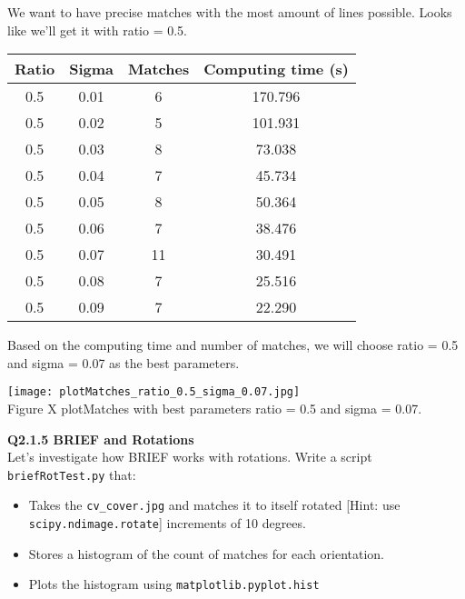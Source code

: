 \documentclass[12pt,letterpaper, onecolumn]{exam}
\begin{document}
\begin{questions}
\begin{solution}
\begin{center}
        \end{center}
        We want to have precise matches with the most amount of lines possible. Looks like we'll get it with ratio = 0.5.
        \begin{center}
            \begin{tabular}{|c|c|c|c|}
                \hline
                \textbf{Ratio} & \textbf{Sigma} & \textbf{Matches} & \textbf{Computing time (s)} \\
                \hline
                0.5 & 0.01 & 6 & 170.796 \\
                \hline
                0.5 & 0.02 & 5 & 101.931 \\
                \hline
                0.5 & 0.03 & 8 & 73.038 \\
                \hline
                0.5 & 0.04 & 7 & 45.734 \\
                \hline
                0.5 & 0.05 & 8 & 50.364 \\
                \hline
                0.5 & 0.06 & 7 & 38.476 \\
                \hline
                0.5 & 0.07 & 11 & 30.491 \\
                \hline
                0.5 & 0.08 & 7 & 25.516 \\
                \hline
                0.5 & 0.09 & 7 & 22.290 \\
                \hline
            \end{tabular}
        \end{center}
        Based on the computing time and number of matches, we will choose ratio = 0.5 and sigma = 0.07 as the best parameters.
        \begin{center}
            \texttt{[image: plotMatches\_ratio\_0.5\_sigma\_0.07.jpg]}\\
            Figure X plotMatches with best parameters ratio = 0.5 and sigma = 0.07.
        \end{center}

    \end{solution}
    \pagebreak

    \question \textbf{Q2.1.5 BRIEF and Rotations} \\
    Let's investigate how BRIEF works with rotations. Write a script \texttt{briefRotTest.py} that:

    \begin{itemize}
        \item Takes the \texttt{cv\_cover.jpg} and matches it to itself rotated [Hint: use \texttt{scipy.ndimage.rotate}] increments of 10 degrees.
        \item Stores a histogram of the count of matches for each orientation.
        \item Plots the histogram using \texttt{matplotlib.pyplot.hist}
    \end{itemize}


\end{questions}
\end{document}
